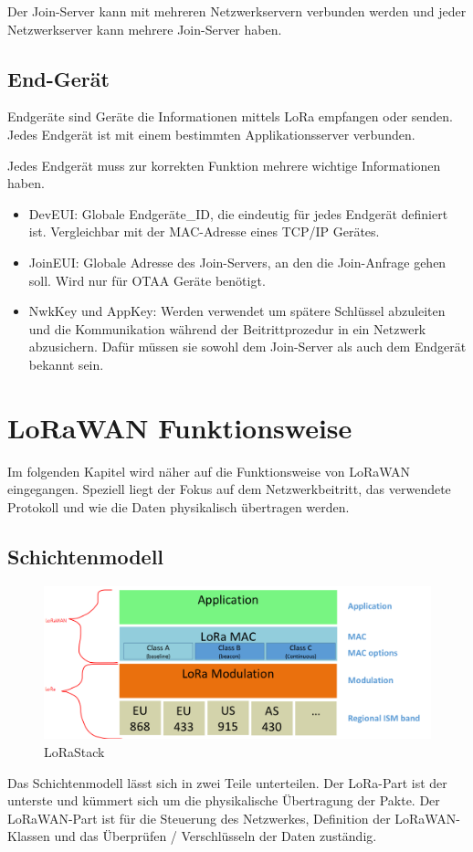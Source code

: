 \documentclass[a4paper, 12pt]{article}
\begin{document}
            Der Join-Server kann mit mehreren Netzwerkservern verbunden werden und jeder Netzwerkserver kann mehrere 
            Join-Server haben.
        \subsection{End-Gerät}\label{sec:endgerät}
            Endgeräte sind Geräte die Informationen mittels LoRa empfangen oder senden. Jedes Endgerät ist mit einem 
            bestimmten Applikationsserver verbunden.

            Jedes Endgerät muss zur korrekten Funktion mehrere wichtige Informationen haben.
            \begin{itemize}
                \item DevEUI: Globale Endgeräte\_ID, die eindeutig für jedes Endgerät definiert ist. Vergleichbar 
                mit der MAC-Adresse eines TCP/IP Gerätes.
                \item JoinEUI: Globale Adresse des Join-Servers, an den die Join-Anfrage gehen soll. Wird nur für OTAA Geräte
                benötigt.
                \item NwkKey und AppKey: Werden verwendet um spätere Schlüssel abzuleiten und die Kommunikation während
                der Beitrittprozedur in ein Netzwerk abzusichern. Dafür müssen sie sowohl dem Join-Server als auch dem
                Endgerät bekannt sein.
            \end{itemize}
            \cite[S.47 ff.]{LoRaSpec}

    \section{LoRaWAN Funktionsweise}
        Im folgenden Kapitel wird näher auf die Funktionsweise von LoRaWAN eingegangen. Speziell liegt der Fokus auf
        dem Netzwerkbeitritt, das verwendete Protokoll und wie die Daten physikalisch übertragen werden.
        \subsection{Schichtenmodell}
            \begin{figure}
                \includegraphics[width=\textwidth]{LoRaLayer}
                \caption{LoRaStack \cite[S.7]{WhatIsLoRa}}
            \end{figure}
            Das Schichtenmodell lässt sich in zwei Teile unterteilen. Der LoRa-Part ist der unterste und kümmert sich 
            um die physikalische Übertragung der Pakte. Der LoRaWAN-Part ist für die Steuerung des 
            Netzwerkes, Definition der LoRaWAN-Klassen und das Überprüfen / Verschlüsseln der Daten zuständig.
\end{document}
